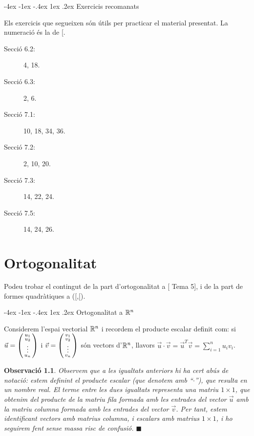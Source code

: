 \documentclass[
  11pt,
]{book}
\makeatletter
\numberwithin{dummy}{section}
\theoremstyle{maincolornumbox}
\newtheorem{remarkT}{Observació}[chapter]
\theoremstyle{blacknumex}
\theoremstyle{blacknumbox}
\theoremstyle{maincolornum}
\newenvironment{remark}{\begin{remarkT}}{\hfill{\tiny\ensuremath{\blacksquare}}\end{remarkT}}
\renewcommand{\section}{\@startsection{section}{1}{\z@}
{-4ex \@plus -1ex \@minus -.4ex}
{1ex \@plus.2ex }
{\normalfont\large\sffamily\bfseries}}
\newlength\esp
\makeatother
\begin{document}
\section{Exercicis recomanats}\label{exercicis-recomanats-2}

Els exercicis que segueixen són útils per practicar el material
presentat. La numeració és la de {[}\citeproc{ref-Bret}{1}{]}.

\begin{description}
\item[Secció 6.2:]
4, 18.
\item[Secció 6.3:]
2, 6.
\item[Secció 7.1:]
10, 18, 34, 36.
\item[Secció 7.2:]
2, 10, 20.
\item[Secció 7.3:]
14, 22, 24.
\item[Secció 7.5:]
14, 24, 26.
\end{description}

\chapter{Ortogonalitat}\label{ortogonalitat}

Podeu trobar el contingut de la part d'ortogonalitat a {[} Tema 5{]}, i
de la part de formes quadràtiques a ({[}\citeproc{ref-Bret}{1}{]},{[}\citeproc{ref-NaXa}{2}{]}).

\section{\texorpdfstring{Ortogonalitat a \(\mathbb{R}^n\)}{Ortogonalitat a \textbackslash R\^{}n}}\label{ortogonalitat-a-rn}

Considerem l'espai vectorial \(\mathbb{R}^n\) i recordem el producte escalar
definit com: si \(\vec u=\left(\begin{smallmatrix}u_1\\u_2\\ \vdots\\u_n\end{smallmatrix}\right)\) i
\(\vec v=\left(\begin{smallmatrix}v_1\\v_2\\ \vdots \\ v_n\end{smallmatrix}\right)\) són vectors d'\(\mathbb{R}^n\), llavors
\(\vec u \cdot \vec v = \vec u^T \vec v=\sum_{i=1}^n u_iv_i\).

\begin{remark}
Observem que a les igualtats anteriors hi ha cert abús de notació: estem
definint el producte escalar (que denotem amb ``\(\cdot\)''), que resulta en
un nombre real. El terme entre les dues igualtats representa una matriu
\(1\times 1\), que obtenim del producte de la matriu fila formada amb les
entrades del vector \(\vec u\) amb la matriu columna formada amb les
entrades del vector \(\vec v\). Per tant, estem identificant vectors amb
matrius columna, i escalars amb matrius \(1\times 1\), i ho seguirem fent
sense massa risc de confusió.
\end{remark}
\end{document}
